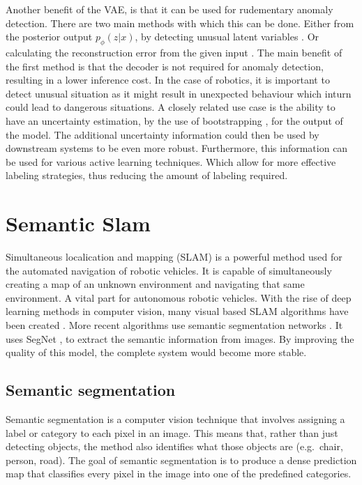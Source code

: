 Another benefit of the VAE, is that it can be used for rudementary anomaly detection. There are two main methods with which this can be done. Either from the posterior output $p_{\phi}(z|x)$, by detecting unusual latent variables \cite{marimont2020anomalydetectionlatentspace,angiulli2020improving,angiulli2023latent}. Or calculating the reconstruction error from the given input \cite{an2015variational, zhou2020unsupervisedanomalylocalizationusing, gouda2022unsupervised}. The main benefit of the first method is that the decoder is not required for anomaly detection, resulting in a lower inference cost. In the case of robotics, it is important to detect unusual situation as it might result in unexpected behaviour which inturn could lead to dangerous situations.
A closely related use case is the ability to have an uncertainty estimation, by the use of bootstrapping \cite{chen2018use,kohl2018probabilistic}, for the output of the model. The additional uncertainty information could then be used by downstream systems to be even more robust. Furthermore, this information can be used for various active learning \cite{hino2020active} techniques. Which allow for more effective labeling strategies, thus reducing the amount of labeling required. 

\section{Semantic Slam}
Simultaneous localication and mapping (SLAM)\cite{chatila1985position} is a powerful method used for the automated navigation of robotic vehicles. It is capable of simultaneously creating a map of an unknown environment and navigating that same environment. A vital part for autonomous robotic vehicles. With the rise of deep learning methods in computer vision, many visual based SLAM algorithms have been created \cite{taketomi2017visual}. More recent algorithms use semantic segmentation networks \cite{yu2018ds}. It uses SegNet \cite{badri2017segnet}, to extract the semantic information from images. By improving the quality of this model, the complete system would become more stable.

\subsection{Semantic segmentation}
Semantic segmentation is a computer vision technique that involves assigning a label or category to each pixel in an image. This means that, rather than just detecting objects, the method also identifies what those objects are (e.g.\, chair, person, road). The goal of semantic segmentation is to produce a dense prediction map that classifies every pixel in the image into one of the predefined categories.

